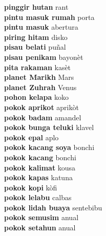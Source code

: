 \textbf{ pinggir hutan  } rant \\
\textbf{ pintu masuk rumah  } porta \\
\textbf{ pintu masuk  } abertura \\
\textbf{ piring hitam  } disko \\
\textbf{ pisau belati  } puñal \\
\textbf{ pisau penikam  } bayonèt \\
\textbf{ pita rakaman  } kasèt \\
\textbf{ planet Marikh  } Mars \\
\textbf{ planet Zuhrah  } Venus \\
\textbf{ pohon kelapa  } koko \\
\textbf{ pokok aprikot  } aprikòt \\
\textbf{ pokok badam  } amandel \\
\textbf{ pokok bunga teluki  } klavel \\
\textbf{ pokok epal  } aplo \\
\textbf{ pokok kacang soya  } bonchi \\
\textbf{ pokok kacang  } bonchi \\
\textbf{ pokok kalimat  } kousa \\
\textbf{ pokok kapas  } katuna \\
\textbf{ pokok kopi  } kòfi \\
\textbf{ pokok lelabu  } calbas \\
\textbf{ pokok lidah buaya  } sentebibu \\
\textbf{ pokok semusim  } anual \\
\textbf{ pokok setahun  } anual \\
